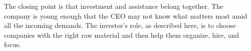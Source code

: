 The closing point is that investment and assistance belong together. The company is young enough that the CEO may not know what matters most amid all the incoming demands. The investor's role, as described here, is to choose companies with the right raw material and then help them organize, hire, and focus.